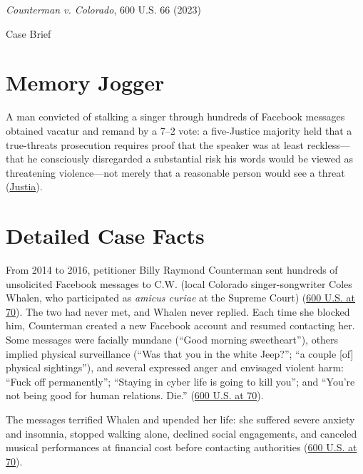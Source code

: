 \documentclass[12pt]{article}
\begin{document}
\begin{center}
{\LARGE \textit{Counterman v. Colorado}, 600 U.S. 66 (2023)\par}
\vspace{0.8em}
{\large Case Brief\par}
\end{center}
\vspace{1em}

\section{Memory Jogger}
A man convicted of stalking a singer through hundreds of Facebook messages obtained vacatur and remand by a 7--2 vote: a five-Justice majority held that a true-threats prosecution requires proof that the speaker was at least reckless---that he consciously disregarded a substantial risk his words would be viewed as threatening violence---not merely that a reasonable person would see a threat (\href{https://supreme.justia.com/cases/federal/us/600/22-138/}{Justia}).

\section{Detailed Case Facts}
From 2014 to 2016, petitioner Billy Raymond Counterman sent hundreds of unsolicited Facebook messages to C.W. (local Colorado singer-songwriter Coles Whalen, who participated as \textit{amicus curiae} at the Supreme Court) (\href{https://supreme.justia.com/cases/federal/us/600/22-138/}{600 U.S. at 70}). The two had never met, and Whalen never replied. Each time she blocked him, Counterman created a new Facebook account and resumed contacting her. Some messages were facially mundane (``Good morning sweetheart''), others implied physical surveillance (``Was that you in the white Jeep?''; ``a couple [of] physical sightings''), and several expressed anger and envisaged violent harm: ``Fuck off permanently''; ``Staying in cyber life is going to kill you''; and ``You're not being good for human relations. Die.'' (\href{https://www.supremecourt.gov/opinions/22pdf/600us1r51_g3bi.pdf}{600 U.S. at 70}).

The messages terrified Whalen and upended her life: she suffered severe anxiety and insomnia, stopped walking alone, declined social engagements, and canceled musical performances at financial cost before contacting authorities (\href{https://supreme.justia.com/cases/federal/us/600/22-138/}{600 U.S. at 70}).
\end{document}
